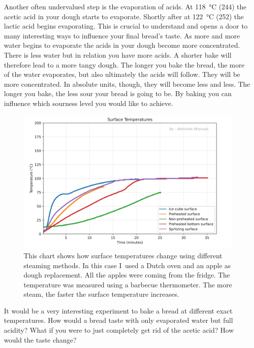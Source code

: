 Another often undervalued step is the evaporation of acids. At
\qty{118}{\degreeCelsius} (\qty{244}{\degF}) the acetic acid in your dough starts to evaporate.
Shortly after at  \qty{122}{\degreeCelsius} (\qty{252}{\degF}) the lactic acid begins evaporating.
This is crucial to understand and opens a door to many interesting
ways to influence your final bread's taste. As more and more water
begins to evaporate the acids in your dough become more concentrated.
There is less water but in relation you have more acids. A shorter
bake will therefore lead to a more tangy dough. The longer you bake the bread,
the more of the water evaporates, but also ultimately the acids will follow.
They will be more concentrated. In absolute units, though, they
will become less and less. The longer you bake, the less sour
your bread is going to be. By baking you can
influence which sourness level you would like to achieve.

\begin{figure}[!htb]
  \includegraphics[width=\textwidth]{baking-experiment-temperatures.png}
  \caption[Surface temperature for different steaming methods]{This
      chart shows how surface temperatures change using different steaming
      methods. In this case I~used a Dutch oven and an apple as dough
      replacement. All the apples were coming from the fridge. The temperature
      was measured using a barbecue thermometer.  The more steam, the faster
      the surface temperature increases.}
\end{figure}

It would be a very interesting experiment to bake a bread at different exact
temperatures. How would a bread taste with only evaporated water but
full acidity? What if you were to just completely get rid of the acetic
acid? How would the taste change?

